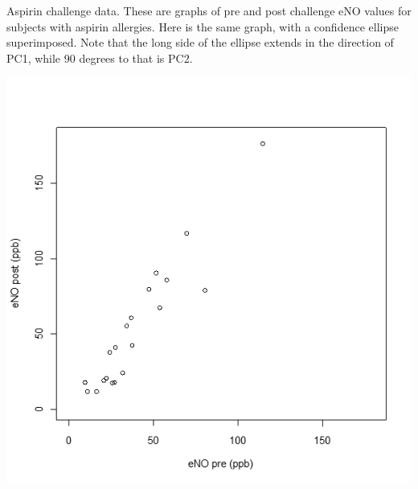 \documentclass[
  9pt,
  ignorenonframetext,
]{beamer}
\begin{document}
\begin{frame}{}
\protect\hypertarget{section-11}{}
Aspirin challenge data. These are graphs of pre and post challenge eNO
values for subjects with aspirin allergies. Here is the same graph, with
a confidence ellipse superimposed. Note that the long side of the
ellipse extends in the direction of PC1, while 90 degrees to that is
PC2.

\tiny

\begin{center}\includegraphics[width=0.6\linewidth]{figs_L2/L2-f18} \end{center}

\tiny
\end{frame}
\end{document}
